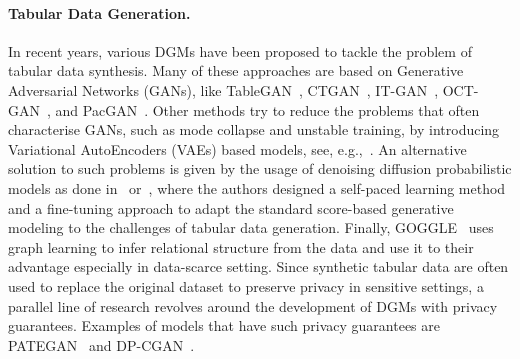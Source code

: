 \paragraph{Tabular Data Generation.} In recent years, various DGMs have been proposed to tackle the problem of tabular data synthesis. Many of these approaches are based on Generative Adversarial Networks (GANs), like TableGAN~\citep{park2018_tableGAN}, CTGAN~\citep{xu2019_CTGAN}, IT-GAN~\citep{lee2021invertible}, OCT-GAN~\citep{kim2021oct}, and PacGAN~\citep{lin2018pacgan}.
Other methods try to reduce the problems that often characterise GANs, such as mode collapse and unstable training, by introducing Variational AutoEncoders (VAEs) based models, see, e.g.,~\citep{xu2018semantic,srivastava2017_veegan,wan2017vae_imbalanced}. An alternative solution to such problems is given by the usage of denoising diffusion probabilistic models as done in~\citep{kotelnikov2023tabddpm} or~\citep{kim2023stasy}, where the authors designed a self-paced learning method and a fine-tuning approach to adapt the standard score-based generative modeling to the challenges of tabular data generation. Finally, GOGGLE~\citep{liu2022goggle} uses graph learning to infer relational structure from the data and use it to their advantage especially in data-scarce setting. Since synthetic tabular data are often used to replace the original dataset to preserve privacy in sensitive settings, a parallel line of research revolves around the development of DGMs with privacy guarantees. Examples of models that have such privacy guarantees are PATEGAN~\citep{yoon2020_privacy}  and DP-CGAN~\citep{rehaneh2020dpcgan_privacy}.